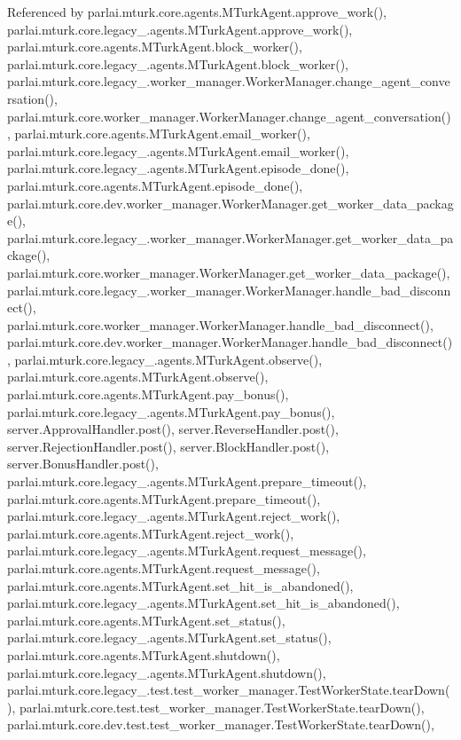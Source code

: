Referenced by parlai.\+mturk.\+core.\+agents.\+M\+Turk\+Agent.\+approve\+\_\+work(), parlai.\+mturk.\+core.\+legacy\+\_.\+agents.\+M\+Turk\+Agent.\+approve\+\_\+work(), parlai.\+mturk.\+core.\+agents.\+M\+Turk\+Agent.\+block\+\_\+worker(), parlai.\+mturk.\+core.\+legacy\+\_.\+agents.\+M\+Turk\+Agent.\+block\+\_\+worker(), parlai.\+mturk.\+core.\+legacy\+\_.\+worker\+\_\+manager.\+Worker\+Manager.\+change\+\_\+agent\+\_\+conversation(), parlai.\+mturk.\+core.\+worker\+\_\+manager.\+Worker\+Manager.\+change\+\_\+agent\+\_\+conversation(), parlai.\+mturk.\+core.\+agents.\+M\+Turk\+Agent.\+email\+\_\+worker(), parlai.\+mturk.\+core.\+legacy\+\_.\+agents.\+M\+Turk\+Agent.\+email\+\_\+worker(), parlai.\+mturk.\+core.\+legacy\+\_.\+agents.\+M\+Turk\+Agent.\+episode\+\_\+done(), parlai.\+mturk.\+core.\+agents.\+M\+Turk\+Agent.\+episode\+\_\+done(), parlai.\+mturk.\+core.\+dev.\+worker\+\_\+manager.\+Worker\+Manager.\+get\+\_\+worker\+\_\+data\+\_\+package(), parlai.\+mturk.\+core.\+legacy\+\_.\+worker\+\_\+manager.\+Worker\+Manager.\+get\+\_\+worker\+\_\+data\+\_\+package(), parlai.\+mturk.\+core.\+worker\+\_\+manager.\+Worker\+Manager.\+get\+\_\+worker\+\_\+data\+\_\+package(), parlai.\+mturk.\+core.\+legacy\+\_.\+worker\+\_\+manager.\+Worker\+Manager.\+handle\+\_\+bad\+\_\+disconnect(), parlai.\+mturk.\+core.\+worker\+\_\+manager.\+Worker\+Manager.\+handle\+\_\+bad\+\_\+disconnect(), parlai.\+mturk.\+core.\+dev.\+worker\+\_\+manager.\+Worker\+Manager.\+handle\+\_\+bad\+\_\+disconnect(), parlai.\+mturk.\+core.\+legacy\+\_.\+agents.\+M\+Turk\+Agent.\+observe(), parlai.\+mturk.\+core.\+agents.\+M\+Turk\+Agent.\+observe(), parlai.\+mturk.\+core.\+agents.\+M\+Turk\+Agent.\+pay\+\_\+bonus(), parlai.\+mturk.\+core.\+legacy\+\_.\+agents.\+M\+Turk\+Agent.\+pay\+\_\+bonus(), server.\+Approval\+Handler.\+post(), server.\+Reverse\+Handler.\+post(), server.\+Rejection\+Handler.\+post(), server.\+Block\+Handler.\+post(), server.\+Bonus\+Handler.\+post(), parlai.\+mturk.\+core.\+legacy\+\_.\+agents.\+M\+Turk\+Agent.\+prepare\+\_\+timeout(), parlai.\+mturk.\+core.\+agents.\+M\+Turk\+Agent.\+prepare\+\_\+timeout(), parlai.\+mturk.\+core.\+legacy\+\_.\+agents.\+M\+Turk\+Agent.\+reject\+\_\+work(), parlai.\+mturk.\+core.\+agents.\+M\+Turk\+Agent.\+reject\+\_\+work(), parlai.\+mturk.\+core.\+legacy\+\_.\+agents.\+M\+Turk\+Agent.\+request\+\_\+message(), parlai.\+mturk.\+core.\+agents.\+M\+Turk\+Agent.\+request\+\_\+message(), parlai.\+mturk.\+core.\+agents.\+M\+Turk\+Agent.\+set\+\_\+hit\+\_\+is\+\_\+abandoned(), parlai.\+mturk.\+core.\+legacy\+\_.\+agents.\+M\+Turk\+Agent.\+set\+\_\+hit\+\_\+is\+\_\+abandoned(), parlai.\+mturk.\+core.\+agents.\+M\+Turk\+Agent.\+set\+\_\+status(), parlai.\+mturk.\+core.\+legacy\+\_.\+agents.\+M\+Turk\+Agent.\+set\+\_\+status(), parlai.\+mturk.\+core.\+agents.\+M\+Turk\+Agent.\+shutdown(), parlai.\+mturk.\+core.\+legacy\+\_.\+agents.\+M\+Turk\+Agent.\+shutdown(), parlai.\+mturk.\+core.\+legacy\+\_.\+test.\+test\+\_\+worker\+\_\+manager.\+Test\+Worker\+State.\+tear\+Down(), parlai.\+mturk.\+core.\+test.\+test\+\_\+worker\+\_\+manager.\+Test\+Worker\+State.\+tear\+Down(), parlai.\+mturk.\+core.\+dev.\+test.\+test\+\_\+worker\+\_\+manager.\+Test\+Worker\+State.\+tear\+Down(), 